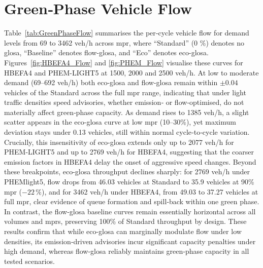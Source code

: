 \section{Green‐Phase Vehicle Flow}
\label{sec:Results_GreenPhaseFlow}

Table~\ref{tab:GreenPhaseFlow} summarises the per‐cycle vehicle flow for demand levels from 69 to 3462 veh/h across \ac{mpr}, where \enquote{Standard} (0 \%) denotes no \ac{glosa}, \enquote{Baseline} denotes \ac{flow-glosa}, and \enquote{Eco} denotes \ac{eco-glosa}. Figures~\ref{fig:HBEFA4_Flow} and \ref{fig:PHEM_Flow} visualise these curves for HBEFA4 and PHEM-LIGHT5 at 1500, 2000 and 2500 veh/h. 
At low to moderate demand (69–692 veh/h) both \ac{eco-glosa} and \ac{flow-glosa} remain within $\pm 0.04$ vehicles of the Standard across the full \ac{mpr} range, indicating that under light traffic densities speed advisories, whether emission‐ or flow‐optimised, do not materially affect green‐phase capacity. As demand rises to 1385 veh/h, a slight scatter appears in the \ac{eco-glosa} curve at low \ac{mpr} (10–30\%), yet maximum deviation stays under 0.13 vehicles, still within normal cycle‐to‐cycle variation. Crucially, this insensitivity of \ac{eco-glosa} extends only up to 2077 veh/h for PHEM-LIGHT5 and up to 2769 veh/h for HBEFA4, suggesting that the coarser emission factors in HBEFA4 delay the onset of aggressive speed changes. Beyond these breakpoints, \ac{eco-glosa} throughput declines sharply: for 2769 veh/h under PHEMlight5, flow drops from 46.03 vehicles at Standard to 35.9 vehicles at 90\% \ac{mpr} ($-22\,\%$), and for 3462 veh/h under HBEFA4, from 49.03 to 37.27 vehicles at full \ac{mpr}, clear evidence of queue formation and spill‐back within one green phase. In contrast, the \ac{flow-glosa} baseline curves remain essentially horizontal across all volumes and \ac{mpr}s, preserving 100\% of Standard throughput by design. These results confirm that while \ac{eco-glosa} can marginally modulate flow under low densities, its emission‐driven advisories incur significant capacity penalties under high demand, whereas \ac{flow-glosa} reliably maintains green‐phase capacity in all tested scenarios.
